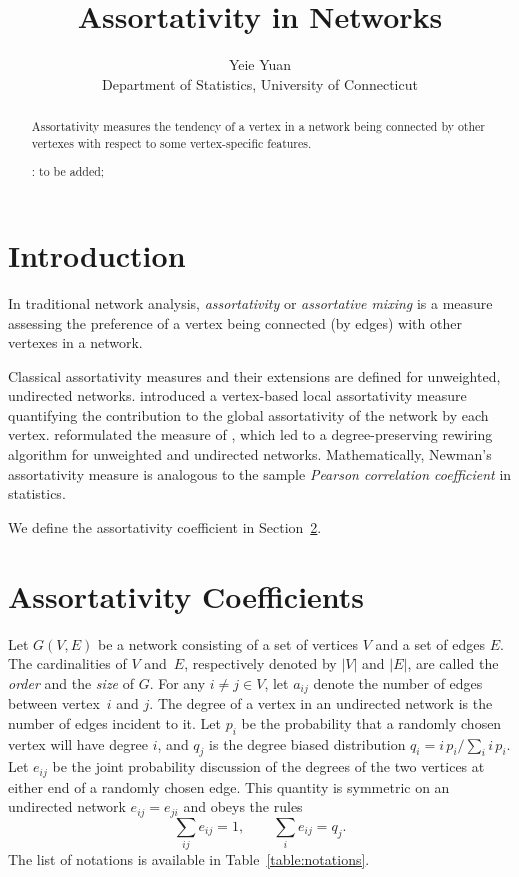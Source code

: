 \documentclass[12pt, letterpaper, titlepage]{article}
\title{Assortativity in Networks}
\author{Yeie Yuan\\
  Department of Statistics, University of Connecticut\\
}
\date{}
\begin{document}
\maketitle

\doublespace

\begin{abstract}
  Assortativity measures the tendency of a vertex in a network being 
  connected by other vertexes with respect to some vertex-specific 
  features. 

\bigskip
\noindent{}:
to be added;
\end{abstract}

\section{Introduction}
\label{sec:intro}

In traditional network analysis, {\em assortativity} or {\em
assortative mixing} \citep{Newman2002assortative} is a measure
assessing the preference of a vertex being connected (by edges) with
other vertexes in a network.

Classical assortativity measures and their extensions are defined for
unweighted, undirected networks. \citet{Piraveenan2008local}
introduced a vertex-based local assortativity measure quantifying
the contribution to the global assortativity of the network
by each vertex. \citet{VanMieghem2010influence}
reformulated the measure of \citet{Newman2002assortative},
which led to a degree-preserving
rewiring algorithm for unweighted and undirected networks.
Mathematically, Newman's assortativity measure is
analogous to the sample {\em Pearson correlation coefficient} in
statistics.


We define the assortativity coefficient in 
Section~\ref{sec:assort}.


\section{Assortativity Coefficients}
\label{sec:assort}


Let $G(V, E)$ be a network consisting of a set of vertices $V$ and a
set of edges
$E$. The cardinalities of $V$ and~$E$, respectively denoted by $|V|$
and $|E|$, are called the {\em order} and the {\em size} of $G$. For
any $i \neq j \in V$, let $a_{ij}$ denote the number of edges
between vertex~$i$ and $j$.
The degree of a vertex in an undirected network is
the number of edges incident to it.
Let $p_i$ be the probability that a randomly chosen vertex will have 
degree $i$, and $q_j$ is the degree biased distribution
$q_i = i\, p_i / \sum_{i} i\, p_i$.
Let $e_{ij}$ be the joint probability discussion of the degrees 
of the two vertices at either end of a randomly chosen edge.
This quantity is symmetric on an undirected network $e_{ij} = e_{ji}$ and 
obeys the rules
\begin{equation*}
    \sum_{ij} e_{ij} = 1, \qquad
    \sum_{i} e_{ij} = q_j.
\end{equation*}
The list of notations is available in Table~\ref{table:notations}.
\end{document}
